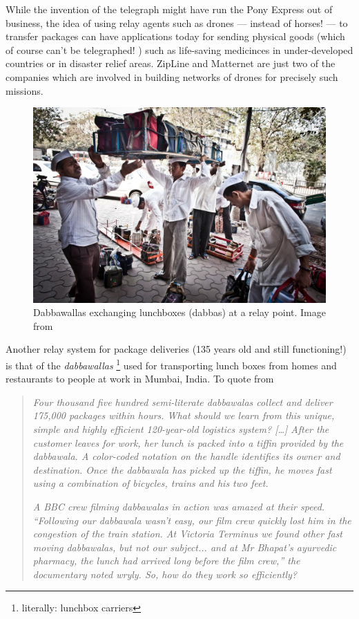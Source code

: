 \documentclass[10pt, english, oneside]{report}
\begin{document}
\begin{appendices}
While the invention of the telegraph might have run the Pony Express out of business, the idea of using relay agents 
such as drones --- instead of horses! --- to transfer packages can have applications today for sending physical goods 
(which of course can't be telegraphed! \Winkey) such as  life-saving medicinces in under-developed 
countries or in disaster relief areas. 
ZipLine\cite{zipline} \cite{zipline-ted} and Matternet \cite{matternet} are just two of the companies which 
are involved in building networks of drones for precisely such missions.

\begin{figure}[H]
  \centering
  \includegraphics[width=12cm]{docs/dabba.jpg}
  \caption{Dabbawallas exchanging lunchboxes (dabbas) at a relay point. Image from \cite{Magazine2019Oct} }
\end{figure}

Another relay system for package deliveries (135 years old and still functioning!) is that of 
the \textit{dabbawallas} \footnote{literally: lunchbox carriers} used for transporting lunch boxes from 
homes and restaurants to people at work in Mumbai, India. To quote from \cite{dabba}
\begin{quote}
\textit{Four thousand five hundred semi-literate dabbawalas collect and deliver 175,000 packages 
within hours. What should we learn from this unique, simple and highly efficient 120-year-old 
logistics system? [\ldots] After the customer leaves for work, her lunch is packed into a tiffin 
provided by the dabbawala. A color-coded notation on the handle identifies its owner and destination. 
Once the dabbawala has picked up the tiffin, he moves fast using a combination of bicycles, trains and his 
two feet.}

\textit{A BBC crew filming dabbawalas in action was amazed at their speed. ``Following our dabbawala 
wasn't easy, our film crew quickly lost him in the congestion of the train station. At Victoria 
Terminus we found other fast moving dabbawalas, but not our subject... and at Mr Bhapat's ayurvedic 
pharmacy, the lunch had arrived long before the film crew,'' the documentary noted wryly. So, how do 
they work so efficiently?}


\end{quote}
\end{appendices}
\end{document}
